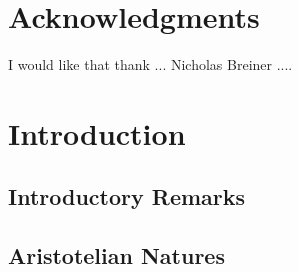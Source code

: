 \def\mychapter{I}

\chapter*{Acknowledgments}
I would like that thank ... Nicholas Breiner ....
\chapter{Introduction}\label{ch:intro}
\section{Introductory Remarks}
\section{Aristotelian Natures}
\chaptertail 

